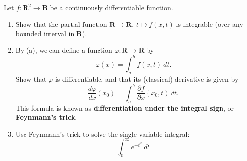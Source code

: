 \documentclass{article}
\newcommand{\R}{\mathbf{R}}
\theoremstyle{plain} %
\numberwithin{thm}{section} %
\theoremstyle{definition}
\begin{document}
        Let $f:\R^2\rightarrow \R$ be a continuously differentiable function.
        \begin{enumerate}[label=(\alph*)]
            \item  Show that the partial function $\R\rightarrow \R$, $t\mapsto f(x,t)$ is integrable (over any bounded interval in $\R$).
            
            \item By (a), we can define a function $\varphi:\R\rightarrow \R$ by
                \[ \varphi(x) = \int_a^b f(x,t) \ dt. \]
            Show that $\varphi$ is differentiable, and that its (classical) derivative is given by
                \[ \dfrac{d\varphi}{dx}(x_0) = \int_a^b \dfrac{\partial f}{\partial x}(x_0,t) \ dt. \]
            This formula is known as \textbf{differentiation under the integral sign}, or \textbf{Feynmann's trick}.
        
            \item Use Feynmann's trick to solve the single-variable integral:
                \[ \int_0^\infty e^{- t^2} \ dt \]
        \end{enumerate}
\end{document}
